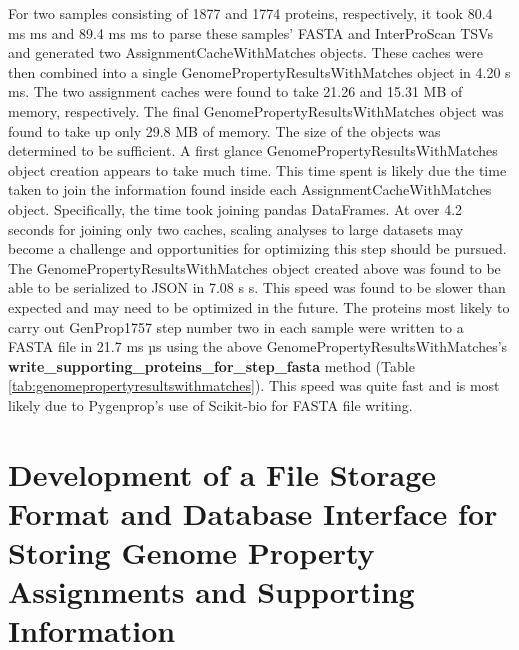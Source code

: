 For two samples consisting of 1877 and 1774 proteins, respectively, it took 80.4 ms  ms and 89.4 ms  ms to parse these samples' FASTA and InterProScan TSVs and generated two AssignmentCacheWithMatches objects. These caches were then combined into a single GenomePropertyResultsWithMatches object in 4.20 s  ms.  The two assignment caches were found to take 21.26 and 15.31 MB of memory, respectively. The final GenomePropertyResultsWithMatches object was found to take up only 29.8 MB of memory. The size of the objects was determined to be sufficient. A first glance GenomePropertyResultsWithMatches object creation appears to take much time. This time spent is likely due the time taken to join the information found inside each AssignmentCacheWithMatches object. Specifically, the time took joining pandas DataFrames. At over 4.2 seconds for joining only two caches, scaling analyses to large datasets may become a challenge and opportunities for optimizing this step should be pursued. The GenomePropertyResultsWithMatches object created above was found to be able to be serialized to JSON in 7.08 s  s. This speed was found to be slower than expected and may need to be optimized in the future. The proteins most likely to carry out GenProp1757 step number two in each sample were written to a FASTA file in 21.7 ms  µs using the above GenomePropertyResultsWithMatches's \textbf{write\_supporting\_proteins\_for\_step\_fasta} method (Table \ref{tab:genomepropertyresultswithmatches}). This speed was quite fast and is most likely due to Pygenprop's use of Scikit-bio for FASTA file writing.

\section{Development of a File Storage Format and Database Interface for Storing Genome Property Assignments and Supporting Information} \label{MicromedaFiles}

